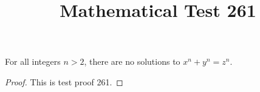 \documentclass{amsart}
\begin{document}
\title{Mathematical Test 261}
\begin{theorem}
For all integers $n > 2$, there are no solutions to $x^n + y^n = z^n$.
\end{theorem}
\begin{proof}
This is test proof 261.
\end{proof}
\end{document}
